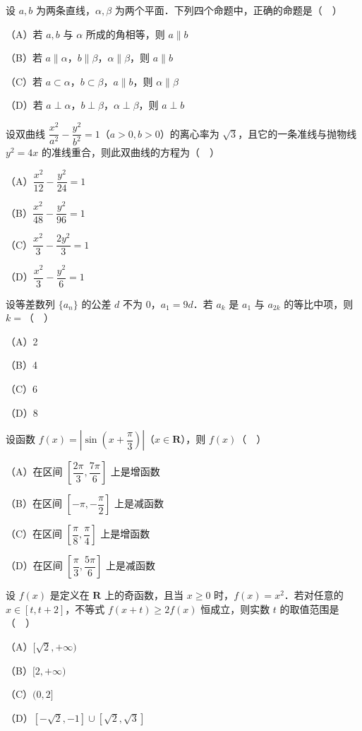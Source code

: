 \begin{question}
设 $a,b$ 为两条直线，$\alpha,\beta$ 为两个平面．下列四个命题中，正确的命题是（　）

（A）若 $a,b$ 与 $\alpha$ 所成的角相等，则 $a\parallel b$

（B）若 $a\parallel\alpha$，$b\parallel\beta$，$\alpha\parallel\beta$，则 $a\parallel b$

（C）若 $a\subset\alpha$，$b\subset\beta$，$a\parallel b$，则 $\alpha\parallel\beta$

（D）若 $a\perp\alpha$，$b\perp\beta$，$\alpha\perp\beta$，则 $a\perp b$

\end{question}
\begin{question}
设双曲线 $\dfrac{x^2}{a^2}-\dfrac{y^2}{b^2}=1$（$a>0,b>0$）的离心率为 $\sqrt3$，且它的一条准线与抛物线 $y^2=4x$ 的准线重合，则此双曲线的方程为（　）

（A）$\dfrac{x^2}{12}-\dfrac{y^2}{24}=1$

（B）$\dfrac{x^2}{48}-\dfrac{y^2}{96}=1$

（C）$\dfrac{x^2}{3}-\dfrac{2y^2}{3}=1$

（D）$\dfrac{x^2}{3}-\dfrac{y^2}{6}=1$

\end{question}
\begin{question}
设等差数列 $\{a_n\}$ 的公差 $d$ 不为 $0$，$a_1=9d$．若 $a_k$ 是 $a_1$ 与 $a_{2k}$ 的等比中项，则 $k=$（　）

（A）2

（B）4

（C）6

（D）8

\end{question}
\begin{question}
设函数 $f(x)=\left|\sin\left(x+\dfrac{\pi}{3}\right)\right|$（$x\in\mathbf R$），则 $f(x)$（　）

（A）在区间 $\left[\dfrac{2\pi}{3},\dfrac{7\pi}{6}\right]$ 上是增函数

（B）在区间 $\left[-\pi,-\dfrac{\pi}{2}\right]$ 上是减函数

（C）在区间 $\left[\dfrac{\pi}{8},\dfrac{\pi}{4}\right]$ 上是增函数

（D）在区间 $\left[\dfrac{\pi}{3},\dfrac{5\pi}{6}\right]$ 上是减函数

\end{question}
\begin{question}
设 $f(x)$ 是定义在 $\mathbf R$ 上的奇函数，且当 $x\geqslant 0$ 时，$f(x)=x^2$．若对任意的 $x\in[t,t+2]$，不等式 $f(x+t)\geqslant 2f(x)$ 恒成立，则实数 $t$ 的取值范围是（　）

（A）$[\sqrt2,+\infty)$

（B）$[2,+\infty)$

（C）$(0,2]$

（D）$[-\sqrt2,-1]\cup[\sqrt2,\sqrt3]$

\end{question}

